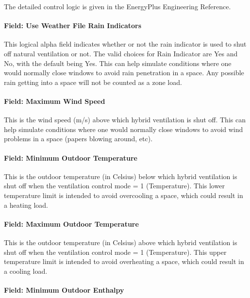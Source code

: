 The detailed control logic is given in the EnergyPlus Engineering Reference.

\paragraph{Field: Use Weather File Rain Indicators}\label{field-use-weather-file-rain-indicators-000}

This logical alpha field indicates whether or not the rain indicator is used to shut off natural ventilation or not. The valid choices for Rain Indicator are Yes and No, with the default being Yes. This can help simulate conditions where one would normally close windows to avoid rain penetration in a space. Any possible rain getting into a space will not be counted as a zone load.

\paragraph{Field: Maximum Wind Speed}\label{field-maximum-wind-speed-000}

This is the wind speed (m/s) above which hybrid ventilation is shut off. This can help simulate conditions where one would normally close windows to avoid wind problems in a space (papers blowing around, etc).

\paragraph{Field: Minimum Outdoor Temperature}\label{field-minimum-outdoor-temperature-000}

This is the outdoor temperature (in Celsius) below which hybrid ventilation is shut off when the ventilation control mode = 1 (Temperature). This lower temperature limit is intended to avoid overcooling a space, which could result in a heating load.

\paragraph{Field: Maximum Outdoor Temperature}\label{field-maximum-outdoor-temperature-000}

This is the outdoor temperature (in Celsius) above which hybrid ventilation is shut off when the ventilation control mode = 1 (Temperature). This upper temperature limit is intended to avoid overheating a space, which could result in a cooling load.

\paragraph{Field: Minimum Outdoor Enthalpy}\label{field-minimum-outdoor-enthalpy}


